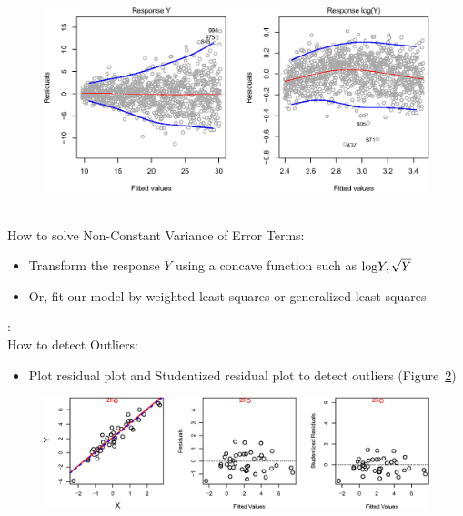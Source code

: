     \documentclass[12pt,fleqn,a4paper]{article}%
\theoremstyle{definition}
\theoremstyle{plain}
\numberwithin{equation}{section}
\begin{document}
\begin{figure}[H]
\centering
\includegraphics[scale=0.85]{images//3_11.eps}
\\~\\
\caption{}\label{figure-3.11}
\end{figure}

How to solve Non-Constant Variance of Error Terms:
\begin{itemize}
\item Transform the response $Y$ using a concave function such as ${\rm log}Y, \sqrt{Y}$
\item Or, fit our model by weighted least squares or generalized least squares
\end{itemize}


\textbf{\color{blue}{4. Outliers}}:\\
How to detect Outliers:
\begin{itemize}
\item Plot residual plot and Studentized residual plot to detect outliers (Figure~\ref{figure-3.12})
\end{itemize}

\begin{figure}[H]
\centering
\includegraphics[scale=0.85]{images//3_12.eps}
\\~\\
\caption{}\label{figure-3.12}
\end{figure}
\end{document}
